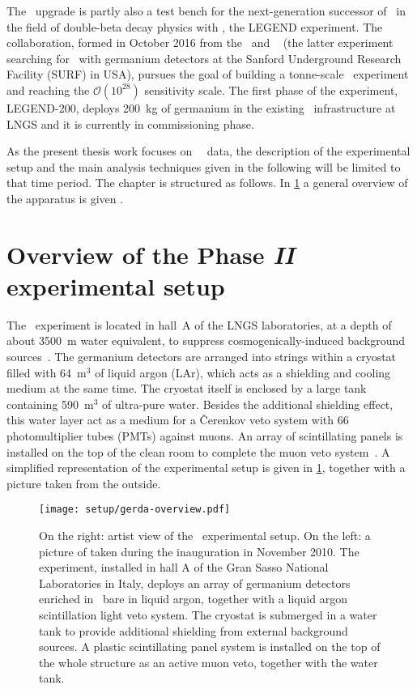 The \phasetwop\ upgrade is partly also a test bench for the next-generation successor of
\gerda\ in the field of double-beta decay physics with \gesix, the LEGEND experiment. The
collaboration, formed in October 2016 from the \gerda\ and \majorana~\cite{Abgrall2014}
(the latter experiment searching for \onbb\ with germanium detectors at the Sanford
Underground Research Facility (SURF) in USA), pursues the goal of building a tonne-scale
\gesix\ experiment and reaching the $\mathcal{O}(10^{28})$ sensitivity scale. The first
phase of the experiment, LEGEND-200, deploys 200~kg of germanium in the existing \gerda\
infrastructure at LNGS and it is currently in commissioning phase.

As the present thesis work focuses on \gerda\ \phasetwo\ data, the description of the
experimental setup and the main analysis techniques given in the following will be limited
to that time period. The chapter is structured as follows. In \cref{sec:gerda:setup} a
general overview of the apparatus is given \fillme{expand}.

\section{Overview of the Phase {\normalfont\textit{II}} experimental setup}%
\label{sec:gerda:setup}

The \gerda\ experiment is located in hall~A of the LNGS laboratories, at a depth of about
3500~m water equivalent, to suppress cosmogenically-induced background
sources~\cite{Wiesinger2018}. The germanium detectors are arranged into strings within a
cryostat filled with 64~m$^3$ of liquid argon (LAr), which acts as a shielding and cooling
medium at the same time. The cryostat itself is enclosed by a large tank containing
590~m$^3$ of ultra-pure water.  Besides the additional shielding effect, this water layer
act as a medium for a \v{C}erenkov veto system with 66 photomultiplier tubes (PMTs)
against muons. An array of scintillating panels is installed on the top of the clean room
to complete the muon veto system~\cite{Freund2016}. A simplified representation of the
experimental setup is given in \cref{fig:setup:overview}, together with a picture taken
from the outside.

\begin{figure}
  \centering
  \texttt{[image: setup/gerda-overview.pdf]}
  \caption{%
    On the right: artist view of the \gerda\ experimental setup. On the left: a picture of
    taken during the inauguration in November 2010. The experiment, installed in hall A of
    the Gran Sasso National Laboratories in Italy, deploys an array of germanium detectors
    enriched in \gesix\ bare in liquid argon, together with a liquid argon scintillation
    light veto system. The cryostat is submerged in a water tank to provide additional
    shielding from external background sources. A plastic scintillating panel system is
    installed on the top of the whole structure as an active muon veto, together with the
    water tank.
  }\label{fig:setup:overview}
\end{figure}

